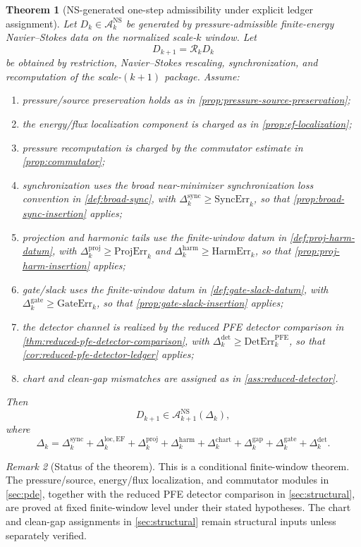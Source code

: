 \documentclass[11pt]{article}
\numberwithin{equation}{section}
\theoremstyle{plain}
\newtheorem{theorem}{Theorem}[section]
\theoremstyle{definition}
\theoremstyle{remark}
\newtheorem{remark}[theorem]{Remark}
\newcommand{\NS}{\mathrm{NS}}
\newcommand{\harm}{\mathrm{harm}}
\newcommand{\proj}{\mathrm{proj}}
\newcommand{\sync}{\mathrm{sync}}
\newcommand{\gate}{\mathrm{gate}}
\newcommand{\detc}{\mathrm{det}}
\newcommand{\chart}{\mathrm{chart}}
\newcommand{\gap}{\mathrm{gap}}
\newcommand{\EF}{\mathrm{EF}}
\newcommand{\A}{\mathcal A}
\begin{document}
\begin{theorem}[NS-generated one-step admissibility under explicit ledger assignment]
\label{thm:main}
Let \(D_k\in\A_k^{\NS}\) be generated by pressure-admissible finite-energy
Navier--Stokes data on the normalized scale-\(k\) window.  Let
\[
  D_{k+1}=\mathcal R_kD_k
\]
be obtained by restriction, Navier--Stokes rescaling, synchronization, and
recomputation of the scale-\((k+1)\) package.  Assume:
\begin{enumerate}[label=(\alph*)]
  \item pressure/source preservation holds as in
  \cref{prop:pressure-source-preservation};
  \item the energy/flux localization component is charged as in
  \cref{prop:ef-localization};
  \item pressure recomputation is charged by the commutator estimate in
  \cref{prop:commutator};
  \item synchronization uses the broad near-minimizer synchronization loss
  convention in \cref{def:broad-sync}, with
  \(\Delta_k^{\sync}\ge\mathrm{SyncErr}_k\), so that
  \cref{prop:broad-sync-insertion} applies;
  \item projection and harmonic tails use the finite-window datum in
  \cref{def:proj-harm-datum}, with
  \(\Delta_k^{\proj}\ge\mathrm{ProjErr}_k\) and
  \(\Delta_k^{\harm}\ge\mathrm{HarmErr}_k\), so that
  \cref{prop:proj-harm-insertion} applies;
  \item gate/slack uses the finite-window datum in
  \cref{def:gate-slack-datum}, with
  \(\Delta_k^{\gate}\ge\mathrm{GateErr}_k\), so that
  \cref{prop:gate-slack-insertion} applies;
  \item the detector channel is realized by the reduced PFE detector
  comparison in \cref{thm:reduced-pfe-detector-comparison}, with
  \(\Delta_k^{\detc}\ge\mathrm{DetErr}_k^{\mathrm{PFE}}\), so that
  \cref{cor:reduced-pfe-detector-ledger} applies;
  \item chart and clean-gap mismatches are assigned as in
  \cref{ass:reduced-detector}.
\end{enumerate}
Then
\[
  D_{k+1}\in\A_{k+1}^{\NS}(\Delta_k),
\]
where
\[
  \Delta_k
  =
  \Delta_k^{\sync}
  +\Delta_k^{\mathrm{loc},\EF}
  +\Delta_k^{\proj}
  +\Delta_k^{\harm}
  +\Delta_k^{\chart}
  +\Delta_k^{\gap}
  +\Delta_k^{\gate}
  +\Delta_k^{\detc}.
\]
\end{theorem}

\begin{remark}[Status of the theorem]
This is a conditional finite-window theorem.  The pressure/source,
energy/flux localization, and commutator modules in \cref{sec:pde}, together
with the reduced PFE detector comparison in \cref{sec:structural}, are proved
at fixed finite-window level under their stated hypotheses.  The chart and
clean-gap assignments in \cref{sec:structural} remain structural inputs unless
separately verified.
\end{remark}
\end{document}
